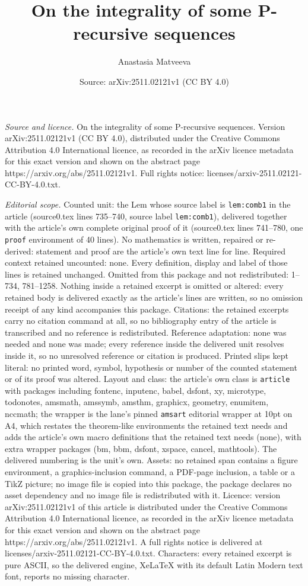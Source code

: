\documentclass[10pt,a4paper]{amsart}
\title[On the integrality of some P-recursive sequences]{On the integrality of some P-recursive sequences}
\author{Anastasia Matveeva}
\date{Source: arXiv:2511.02121v1 (CC BY 4.0)}
\begin{document}
\maketitle

\noindent\emph{Source and licence.} On the integrality of some P-recursive sequences. Version arXiv:2511.02121v1 (CC BY 4.0), distributed under the Creative Commons Attribution 4.0 International licence, as recorded in the arXiv licence metadata for this exact version and shown on the abstract page https://arxiv.org/abs/2511.02121v1. Full rights notice: licenses/arxiv-2511.02121-CC-BY-4.0.txt.\par\smallskip

\noindent\textit{Editorial scope.} Counted unit: the Lem whose source label is \texttt{lem:comb1} in the article (source0.tex lines 735--740, source label \texttt{lem:comb1}), delivered together with the article's own complete original proof of it (source0.tex lines 741--780, one \texttt{proof} environment of 40 lines). No mathematics is written, repaired or re-derived: statement and proof are the article's own text line for line. Required context retained uncounted: none. Every definition, display and label of those lines is retained unchanged. Omitted from this package and not redistributed: 1--734, 781--1258. Nothing inside a retained excerpt is omitted or altered: every retained body is delivered exactly as the article's lines are written, so no omission receipt of any kind accompanies this package. Citations: the retained excerpts carry no citation command at all, so no bibliography entry of the article is transcribed and no reference is redistributed. Reference adaptation: none was needed and none was made; every reference inside the delivered unit resolves inside it, so no unresolved reference or citation is produced. Printed slips kept literal: no printed word, symbol, hypothesis or number of the counted statement or of its proof was altered. Layout and class: the article's own class is \texttt{article} with packages including fontenc, inputenc, babel, dsfont, xy, microtype, todonotes, amsmath, amssymb, amsthm, graphicx, geometry, enumitem, nccmath; the wrapper is the lane's pinned \texttt{amsart} editorial wrapper at 10pt on A4, which restates the theorem-like environments the retained text needs and adds the article's own macro definitions that the retained text needs (none), with extra wrapper packages (bm, bbm, dsfont, xspace, cancel, mathtools). The delivered numbering is the unit's own. Assets: no retained span contains a figure environment, a graphics-inclusion command, a PDF-page inclusion, a table or a TikZ picture; no image file is copied into this package, the package declares no asset dependency and no image file is redistributed with it. Licence: version arXiv:2511.02121v1 of this article is distributed under the Creative Commons Attribution 4.0 International licence, as recorded in the arXiv licence metadata for this exact version and shown on the abstract page https://arxiv.org/abs/2511.02121v1. A full rights notice is delivered at licenses/arxiv-2511.02121-CC-BY-4.0.txt. Characters: every retained excerpt is pure ASCII, so the delivered engine, XeLaTeX with its default Latin Modern text font, reports no missing character.
\end{document}
